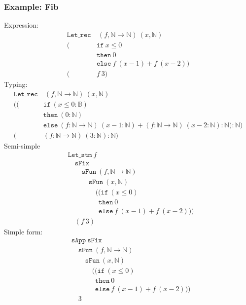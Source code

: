 \documentclass[11pt, leqno]{article}
\begin{document}
\subsubsection{Example: Fib}
Expression:
\begin{align*}
\mathtt{Let\_rec}&~(f,\mathbb{N} \rightarrow \mathbb{N})~(x,\mathbb{N})~\\
  (&\mathtt{if}~x \leq 0\\
                 &\mathtt{then}~0\\
                 &\mathtt{else}~f~(x - 1) + f~(x-2))\\
  (&f~3)
\end{align*}
Typing:
\begin{align*}
\mathtt{Let\_rec}&~(f,\mathbb{N} \rightarrow \mathbb{N})~(x,\mathbb{N})~\\
  ((&\mathtt{if}~(x \leq 0 : \mathbb{B})\\
                 &\mathtt{then}~(0 : \mathbb{N})\\
                 &\mathtt{else}~(f : \mathbb{N} \rightarrow \mathbb{N})~(x - 1 : \mathbb{N}) + (f : \mathbb{N} \rightarrow \mathbb{N})~(x-2 : \mathbb{N}) : \mathbb{N}) : \mathbb{N})\\
  (&(f : \mathbb{N} \rightarrow \mathbb{N})~(3 : \mathbb{N}) : \mathbb{N})
\end{align*}
Semi-simple
\begin{align*}
  &\mathtt{Let\_stm}~f \\
  &\quad \mathtt{sFix} \\
  &\quad \quad \mathtt{sFun}~(f,\mathbb{N} \rightarrow \mathbb{N})\\
  &\quad \quad \quad \mathtt{sFun}~(x,\mathbb{N}) \\
  &\quad \quad \quad \quad ((\mathtt{if}~(x \leq 0)\\
  &\quad \quad \quad \quad ~~\mathtt{then}~0\\
  &\quad \quad \quad \quad ~~\mathtt{else}~f~(x - 1) + f~(x-2)))\\
  &\quad (f~3)
\end{align*}
Simple form:
\begin{align*}
  &\mathtt{sApp}~\mathtt{sFix} \\
  &\quad \mathtt{sFun}~(f,\mathbb{N} \rightarrow \mathbb{N})\\
  &\quad \quad \mathtt{sFun}~(x,\mathbb{N}) \\
  &\quad \quad \quad ((\mathtt{if}~(x \leq 0)\\
  &\quad \quad \quad ~~\mathtt{then}~0\\
  &\quad \quad \quad ~~\mathtt{else}~f~(x - 1) + f~(x-2))) \\
  &\quad 3
\end{align*}
\end{document}
